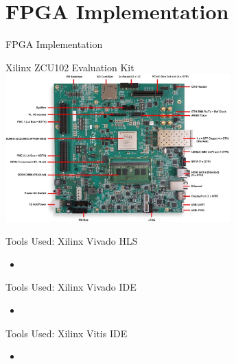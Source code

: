 \setlength{\parskip}{\baselineskip}
\section{FPGA Implementation}

\begin{frame}
    \huge FPGA Implementation
\end{frame}

\begin{frame}{Xilinx ZCU102 Evaluation Kit}
	\centering
	\includegraphics[width=0.65\textwidth]{../Images/Hardware/ZCU102-board-overview.jpg}\\
\end{frame}

\begin{frame}{Tools Used: Xilinx Vivado HLS}
	\begin{itemize}
		\item
	\end{itemize}
\end{frame}

\begin{frame}{Tools Used: Xilinx Vivado IDE}
	\begin{itemize}
		\item
	\end{itemize}
\end{frame}

\begin{frame}{Tools Used: Xilinx Vitis IDE}
	\begin{itemize}
		\item
	\end{itemize}
\end{frame}
